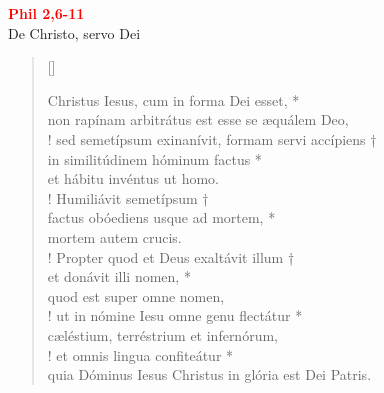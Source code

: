 


\def\greinitialformat#1{%
{\fontsize{39}{39}\selectfont #1}%
}




\vspace{0.3cm}
\begin{center}
 \textcolor{red}{\large \bf Phil 2,6-11}\\
De Christo, servo Dei\\
\end{center}
\begin{verse}[\versewidth]
	

Christus Iesus, cum in forma Dei esset, *\\
non rapínam arbitrátus est
	esse se æquálem Deo,\\!
\vin sed semetípsum exinanívit, formam servi accípiens †\\
\vin in similitúdinem hóminum factus *\\
\vin et hábitu invéntus ut homo.\\!
Humiliávit semetípsum †\\
factus obóediens usque ad mortem, *\\
mortem autem crucis.\\!
\vin Propter quod et Deus exaltávit illum †\\
\vin et donávit illi nomen, *\\
\vin quod est super omne nomen,\\!
ut in nómine Iesu omne genu flectátur *\\
cæléstium, terréstrium et infernórum,\\!
\vin et omnis lingua confiteátur *\\
\vin quia Dóminus Iesus Christus
	in glória est Dei Patris.\\
\end{verse}
\vspace{1cm}


